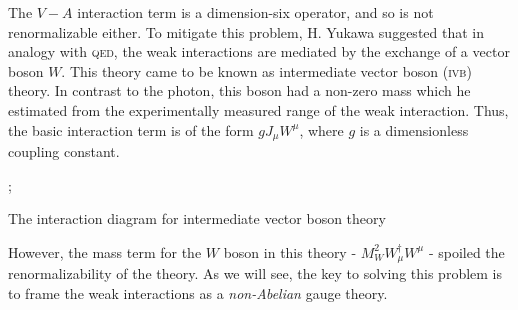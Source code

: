 The $V-A$ interaction term is a dimension-six operator, and so is not renormalizable either. To mitigate this problem, H. Yukawa suggested \citep{Yukawa:1935xg} that in analogy with \textsc{qed}, the weak interactions are mediated by the exchange of a vector boson $W$. This theory came to be known as intermediate vector boson (\textsc{ivb}) theory. In contrast to the photon, this boson had a non-zero mass which he estimated from the experimentally measured range of the weak interaction. Thus, the basic interaction term is of the form $gJ_\mu W^\mu$, where $g$ is a dimensionless coupling constant. 
\begin{marginfigure}
;
\caption{The interaction diagram for intermediate vector boson theory}
\end{marginfigure}
However, the mass term for the $W$ boson in this theory - $M_W^2W_\mu^\dagger W^\mu$ - spoiled the renormalizability of the theory. As we will see, the key to solving this problem is to frame the weak interactions as a \emph{non-Abelian} gauge theory. 

